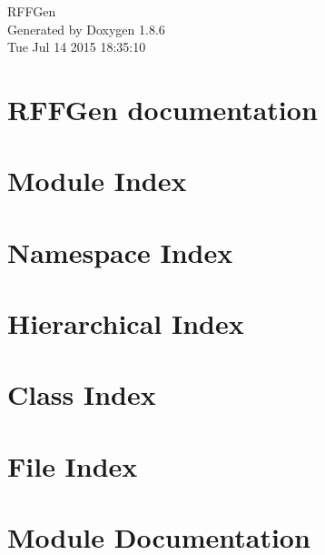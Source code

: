 \documentclass[twoside]{book}
\newcommand{\clearemptydoublepage}{%
  \newpage{\pagestyle{empty}\cleardoublepage}%
}
\begin{document}
\hypersetup{pageanchor=false}
\begin{titlepage}
\vspace*{7cm}
\begin{center}%
{\Large R\-F\-F\-Gen }\\
\vspace*{1cm}
{\large Generated by Doxygen 1.8.6}\\
\vspace*{0.5cm}
{\small Tue Jul 14 2015 18:35:10}\\
\end{center}
\end{titlepage}
\clearemptydoublepage
\tableofcontents
\clearemptydoublepage
{}
\hypersetup{pageanchor=true}

\chapter{R\-F\-F\-Gen documentation}
\label{index}\hypertarget{index}{}
\chapter{Module Index}

\chapter{Namespace Index}

\chapter{Hierarchical Index}

\chapter{Class Index}

\chapter{File Index}

\chapter{Module Documentation}













\end{document}
